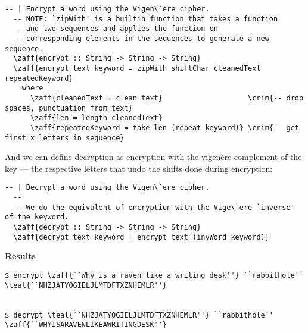 \begin{Answer}
\noindent
{}

\begin{Verbatim}[commandchars=\\\{\}]
  -- | Encrypt a word using the Vigen\`ere cipher.
  -- NOTE: `zipWith' is a builtin function that takes a function 
  -- and two sequences and applies the function on
  -- corresponding elements in the sequences to generate a new sequence.
  \zaff{encrypt :: String -> String -> String}
  \zaff{encrypt text keyword = zipWith shiftChar cleanedText repeatedKeyword}
    where
      \zaff{cleanedText = clean text}                    \crim{-- drop spaces, punctuation from text}
      \zaff{len = length cleanedText}
      \zaff{repeatedKeyword = take len (repeat keyword)} \crim{-- get first x letters in sequence}
\end{Verbatim}
\color{black}
\newpage
\noindent
And we can define decryption as encryption with the vigen\`ere complement of the key ---
the respective letters that undo the shifts done during encryption:

\color{crimson}
\begin{Verbatim}[commandchars=\\\{\}]
  -- | Decrypt a word using the Vigen\`ere cipher.
  --
  -- We do the equivalent of encryption with the Vige\`ere `inverse' of the keyword.
  \zaff{decrypt :: String -> String -> String}
  \zaff{decrypt text keyword = encrypt text (invWord keyword)}
\end{Verbatim}
\color{black}

\begin{center}\textbf{Results}\end{center}

\color{crimson}
\begin{Verbatim}[commandchars=\\\{\}]
$ encrypt \zaff{``Why is a raven like a writing desk''} ``rabbithole''
\teal{``NHZJATYOGIELJLMTDFTXZNHEMLR''}


$ decrypt \teal{``NHZJATYOGIELJLMTDFTXZNHEMLR''} ``rabbithole''
\zaff{``WHYISARAVENLIKEAWRITINGDESK''}
\end{Verbatim}
\color{black}
\end{Answer}
